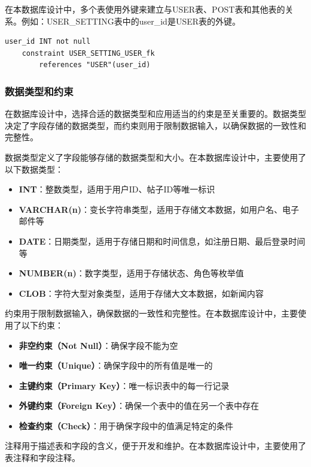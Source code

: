 在本数据库设计中，多个表使用外键来建立与USER表、POST表和其他表的关系。例如：USER\_SETTING表中的user\_id是USER表的外键。

\begin{verbatim}
user_id INT not null
    constraint USER_SETTING_USER_fk
        references "USER"(user_id)
\end{verbatim}

\subsubsection{数据类型和约束}

在数据库设计中，选择合适的数据类型和应用适当的约束是至关重要的。数据类型决定了字段存储的数据类型，而约束则用于限制数据输入，以确保数据的一致性和完整性。

数据类型定义了字段能够存储的数据类型和大小。在本数据库设计中，主要使用了以下数据类型：

\begin{itemize}
    \item \textbf{INT}：整数类型，适用于用户ID、帖子ID等唯一标识
    \item \textbf{VARCHAR(n)}：变长字符串类型，适用于存储文本数据，如用户名、电子邮件等
    \item \textbf{DATE}：日期类型，适用于存储日期和时间信息，如注册日期、最后登录时间等
    \item \textbf{NUMBER(n)}：数字类型，适用于存储状态、角色等枚举值
    \item \textbf{CLOB}：字符大型对象类型，适用于存储大文本数据，如新闻内容
\end{itemize}

约束用于限制数据输入，确保数据的一致性和完整性。在本数据库设计中，主要使用了以下约束：

\begin{itemize}
    \item \textbf{非空约束（Not Null）}：确保字段不能为空
    \item \textbf{唯一约束（Unique）}：确保字段中的所有值是唯一的
    \item \textbf{主键约束（Primary Key）}：唯一标识表中的每一行记录
    \item \textbf{外键约束（Foreign Key）}：确保一个表中的值在另一个表中存在
    \item \textbf{检查约束（Check）}：用于确保字段中的值满足特定的条件
\end{itemize}

注释用于描述表和字段的含义，便于开发和维护。在本数据库设计中，主要使用了表注释和字段注释。

